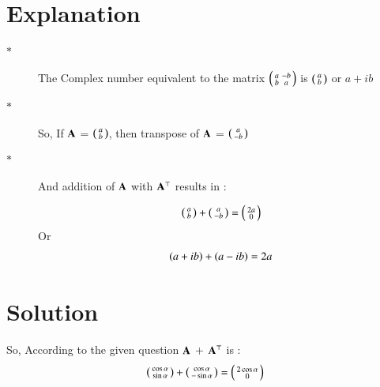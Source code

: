 \documentclass[journal,12pt,twocolumn]{IEEEtran}
\begin{document}
\section{Explanation}
\begin{description}

  \item[$\ast$ ] The Complex number equivalent to the matrix $\begin{psmallmatrix} a & -b\\ b & a \end{psmallmatrix}$ is $\begin{psmallmatrix} a \\ b \end{psmallmatrix}$ or $a+ib$
  \item[$\ast$ ]   So, If $\mathbf{A}$  = $\begin{psmallmatrix} a \\ b \end{psmallmatrix}$, then transpose of $\mathbf{A}$ = $\begin{psmallmatrix} a \\ -b \end{psmallmatrix}$
  \item[$\ast$ ]  And addition of $\mathbf{A}$ with $\mathbf{A}^\top$ results in  :
  
  \begin{align}
      \begin{psmallmatrix} a \\ b \end{psmallmatrix} + \begin{psmallmatrix} a \\ -b \end{psmallmatrix} = \begin{psmallmatrix} 2a \\ 0 \end{psmallmatrix} 
  \end{align}
  Or 
   \begin{align}
      \left(a + ib\right) + \left(a - ib\right)  = 2a 
  \end{align}
\end{description}

\section{Solution}


So, According to the given question $\mathbf{A}$ + $\mathbf{A}^\top$ is : 
\begin{align}
   \begin{psmallmatrix} \cos{\alpha} \\ \sin{\alpha} \end{psmallmatrix} + \begin{psmallmatrix} \cos{\alpha} \\ -\sin{\alpha} \end{psmallmatrix} = \begin{psmallmatrix} 2\cos{\alpha} \\ 0 \end{psmallmatrix} 
\end{align}
\end{document}

